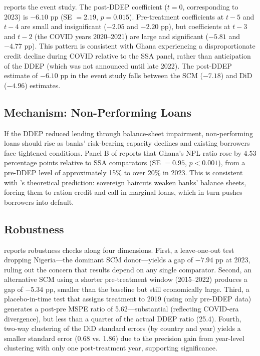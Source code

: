 \documentclass[12pt]{article}
\begin{document}


 reports the event study. The post-DDEP coefficient ($t = 0$, corresponding to 2023) is $-6.10$ pp (SE $= 2.19$, $p = 0.015$). Pre-treatment coefficients at $t-5$ and $t-4$ are small and insignificant ($-2.05$ and $-2.20$ pp), but coefficients at $t-3$ and $t-2$ (the COVID years 2020--2021) are large and significant ($-5.81$ and $-4.77$ pp). This pattern is consistent with Ghana experiencing a disproportionate credit decline during COVID relative to the SSA panel, rather than anticipation of the DDEP (which was not announced until late 2022). The post-DDEP estimate of $-6.10$ pp in the event study falls between the SCM ($-7.18$) and DiD ($-4.96$) estimates.

\subsection{Mechanism: Non-Performing Loans}

If the DDEP reduced lending through balance-sheet impairment, non-performing loans should rise as banks' risk-bearing capacity declines and existing borrowers face tightened conditions. Panel B of  reports that Ghana's NPL ratio rose by 4.53 percentage points relative to SSA comparators (SE $= 0.95$, $p < 0.001$), from a pre-DDEP level of approximately 15\% to over 20\% in 2023. This is consistent with \citet{gennaioli2018sovereign}'s theoretical prediction: sovereign haircuts weaken banks' balance sheets, forcing them to ration credit and call in marginal loans, which in turn pushes borrowers into default.

\subsection{Robustness}



 reports robustness checks along four dimensions. First, a leave-one-out test dropping Nigeria---the dominant SCM donor---yields a gap of $-7.94$ pp at 2023, ruling out the concern that results depend on any single comparator. Second, an alternative SCM using a shorter pre-treatment window (2015--2022) produces a gap of $-5.34$ pp, smaller than the baseline but still economically large. Third, a placebo-in-time test that assigns treatment to 2019 (using only pre-DDEP data) generates a post-pre MSPE ratio of 5.62---substantial (reflecting COVID-era divergence), but less than a quarter of the actual DDEP ratio (25.4). Fourth, two-way clustering of the DiD standard errors (by country and year) yields a smaller standard error (0.68 vs. 1.86) due to the precision gain from year-level clustering with only one post-treatment year, supporting significance.
\end{document}
